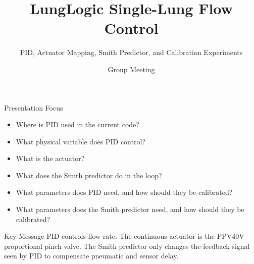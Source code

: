\documentclass[aspectratio=169,10pt]{beamer}
\title{LungLogic Single-Lung Flow Control}
\subtitle{PID, Actuator Mapping, Smith Predictor, and Calibration Experiments}
\author{Group Meeting}
\date{}
\begin{document}
\begin{frame}
  \titlepage
\end{frame}

\begin{frame}{Presentation Focus}
  \begin{itemize}
    \item Where is PID used in the current code?
    \item What physical variable does PID control?
    \item What is the actuator?
    \item What does the Smith predictor do in the loop?
    \item What parameters does PID need, and how should they be calibrated?
    \item What parameters does the Smith predictor need, and how should they be calibrated?
  \end{itemize}

  \vspace{0.8em}
  \begin{block}{Key Message}
    PID controls flow rate. The continuous actuator is the PPV40V proportional pinch valve. The Smith predictor only changes the feedback signal seen by PID to compensate pneumatic and sensor delay.
  \end{block}
\end{frame}
\end{document}
